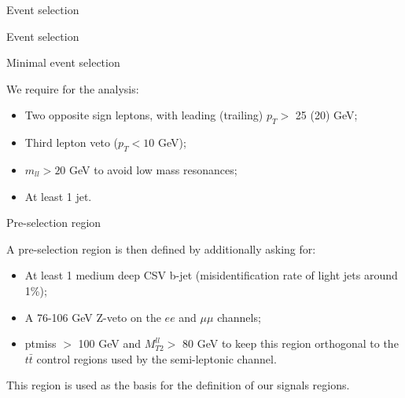 \documentclass[8pt]{beamer}
\begin{document}
\begin{frame}[standout]
Event selection
\end{frame}

\begin{frame}{Event selection}
\justifying
\vspace{5pt}
\begin{block}{\centering Minimal event selection}\end{block} \vfill
\vspace{-5pt}

We require for the analysis:
\begin{itemize}
\item Two opposite sign leptons, with leading (trailing) $p_T >$ 25 (20) GeV;
\item Third lepton veto ($p_T < 10$ GeV);
\item $m_{ll} > 20$ GeV to avoid low mass resonances;
\item At least 1 jet.
\end{itemize} \vfill

\vspace{5pt}
\begin{block}{\centering Pre-selection region}\end{block} \vfill
\vspace{-5pt}

A pre-selection region is then defined by additionally asking for:
\begin{itemize}
\item At least 1 medium deep CSV b-jet (misidentification rate of light jets around 1\%);
\item A 76-106 GeV Z-veto on the $ee$ and $\mu \mu$ channels;
\item ptmiss $>$ 100 GeV and $M_{T2}^{ll} >$ 80 GeV to keep this region orthogonal to the $t \bar t$ control regions used by the semi-leptonic channel.
\end{itemize} \vfill

This region is used as the basis for the definition of our signals regions. \vfill
\end{frame}
\end{document}
